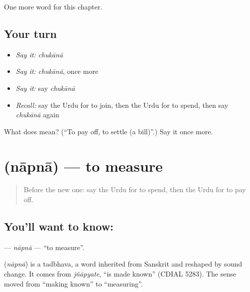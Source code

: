 \begin{grammarlens}[title={What you've built}]
One more word for this chapter.
\end{grammarlens}

\subsection*{Your turn}
\begin{itemize}
\raggedright
  \item \emph{Say it:} \emph{chukānā}
  \item \emph{Say it:} \emph{chukānā}, once more
  \item \emph{Say it:} say \emph{chukānā}
  \item \emph{Recall:} say the Urdu for to join, then the Urdu for to spend, then say \emph{chukānā} again
\end{itemize}

\begin{tcolorbox}[breakable,colback=teal!4,colframe=teal!35!black,title={Before you move on}]
What does  mean? (\textquotedblleft{}To pay off, to settle (a bill)\textquotedblright{}.) Say it once more.
\end{tcolorbox}
\section[\texorpdfstring{\ur{ناپنا} (nāpnā)}{ناپنا (nāpnā)}]{ (nāpnā) — to measure}

\label{lesson:UR-C181-napna}



\begin{quote}
Before the new one: say the Urdu for to spend, then the Urdu for to pay off.
\end{quote}

\subsection*{You'll want to know: }
\textbf{} — \emph{nāpnā} — \textquotedblleft{}to measure\textquotedblright{}.

\begin{cousinweb}
\textbf{} (\emph{nāpnā}) is a tadbhava, a word inherited from Sanskrit and reshaped by sound change. It comes from \emph{jñāpyate}, \textquotedblleft{}is made known\textquotedblright{} (CDIAL 5283). The sense moved from \textquotedblleft{}making known\textquotedblright{} to \textquotedblleft{}measuring\textquotedblright{}.
\end{cousinweb}

